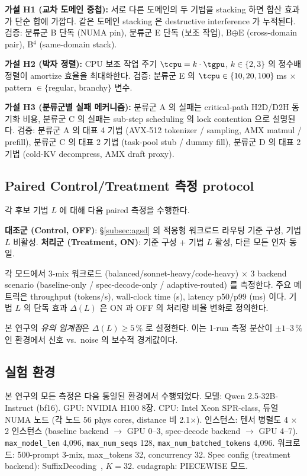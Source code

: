 \textbf{가설 H1 (교차 도메인 중첩):}
서로 다른 도메인의 두 기법을 stacking 하면 합산 효과가 단순 합에 가깝다.
같은 도메인 stacking 은 destructive interference 가 누적된다.
검증: 분류군 B 단독 (NUMA pin), 분류군 E 단독 (보조 작업), B$\oplus$E (cross-domain pair), B$^{4}$ (same-domain stack).

\textbf{가설 H2 (박자 정렬):}
CPU 보조 작업 주기 $\tcpu = k \cdot \tgpu$, $k \in \{2,3\}$ 의 정수배 정렬이 amortize 효율을 최대화한다.
검증: 분류군 E 의 $\tcpu \in \{10, 20, 100\}$\,ms $\times$ pattern $\in \{$regular, branchy$\}$ 변수.

\textbf{가설 H3 (분류군별 실패 메커니즘):}
분류군 A 의 실패는 critical-path H2D/D2H 동기화 비용, 분류군 C 의 실패는 sub-step scheduling 의 lock contention 으로 설명된다.
검증: 분류군 A 의 대표 4 기법 (AVX-512 tokenizer / sampling, AMX matmul / prefill), 분류군 C 의 대표 2 기법 (task-pool stub / dummy fill), 분류군 D 의 대표 2 기법 (cold-KV decompress, AMX draft proxy).

\subsection{Paired Control/Treatment 측정 protocol}
\label{subsec:protocol}

각 후보 기법 $L$ 에 대해 다음 paired 측정을 수행한다.

\textbf{대조군 (Control, OFF)}: \S\ref{subsec:agsd} 의 적응형 워크로드 라우팅 기준 구성, 기법 $L$ 비활성.
\textbf{처리군 (Treatment, ON)}: 기준 구성 + 기법 $L$ 활성, 다른 모든 인자 동일.

각 모드에서 3-mix 워크로드 (balanced/sonnet-heavy/code-heavy) $\times$ 3 backend scenario (baseline-only / spec-decode-only / adaptive-routed) 를 측정한다.
주요 메트릭은 throughput (tokens/s), wall-clock time (s), latency p50/p99 (ms) 이다.
기법 $L$ 의 단독 효과 $\Delta(L)$ 은 ON 과 OFF 의 처리량 비율 변화로 정의한다.

본 연구의 \emph{유의 임계점}은 $\Delta(L) \geq 5\,\%$ 로 설정한다.
이는 1-run 측정 분산이 $\pm 1$--$3\,\%$ 인 환경에서 신호 vs.\ noise 의 보수적 경계값이다.

\subsection{실험 환경}
\label{subsec:setup}

본 연구의 모든 측정은 다음 통일된 환경에서 수행되었다.
모델: Qwen 2.5-32B-Instruct (bf16).
GPU: NVIDIA H100 8장.
CPU: Intel Xeon SPR-class, 듀얼 NUMA 노드 (각 노드 56 phys cores, distance 비 2.1$\times$).
인스턴스: 텐서 병렬도 4 $\times$ 2 인스턴스 (baseline backend $\rightarrow$ GPU 0--3, spec-decode backend $\rightarrow$ GPU 4--7).
\verb|max_model_len| 4{,}096, \verb|max_num_seqs| 128, \verb|max_num_batched_tokens| 4{,}096.
워크로드: 500-prompt 3-mix, max\_tokens 32, concurrency 32.
Spec config (treatment backend): SuffixDecoding~\cite{snowflake-arctic}, $K=32$.
cudagraph: PIECEWISE 모드.

